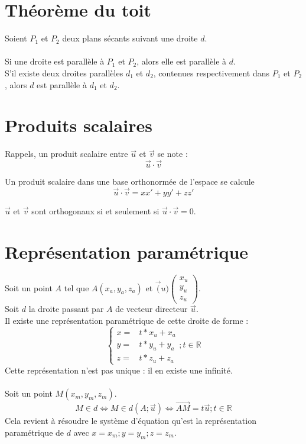 \documentclass{article}
\begin{document}
	\section{Théorème du toit}

	Soient $P_1$ et $P_2$ deux plans sécants suivant une droite $d$. \\
	\\
	Si une droite est parallèle à $P_1$ et $P_2$, alors elle est parallèle à $d$. \\
	S'il existe deux droites parallèles $d_1$ et $d_2$, contenues respectivement dans $P_1$ et $P_2$, alors $d$ est parallèle à $d_1$ et $d_2$.

	\section{Produits scalaires}

	Rappels, un produit scalaire entre $\vec{u}$ et $\vec{v}$ se note :
	\[ \vec{u} \cdot \vec{v} \]

	Un produit scalaire dans une base orthonormée de l'espace se calcule 
	\[ \vec{u} \cdot \vec{v} = xx'+yy'+zz' \]
	
	$\vec{u}$ et $\vec{v}$ sont orthogonaux si et seulement si $\vec{u} \cdot \vec{v} = 0$.

	\section{Représentation paramétrique}

	Soit un point $A$ tel que $A (x_a,y_a,z_a)$ et $\vec(u) \begin{pmatrix}x_u\\y_u\\z_u\end{pmatrix}$. \\
	Soit $d$ la droite passant par $A$ de vecteur directeur $\vec{u}$. \\
	Il existe une représentation paramétrique de cette droite de forme :
	\[ 
		\left\{ 
			\begin{array}{cc}
				x = & t*x_u + x_a \\
				y = & t*y_u + y_a \\
				z = & t*z_u + z_a
			\end{array}
		\right.
		; t \in \mathbb{R}
	\]
	Cette représentation n'est pas unique : il en existe une infinité. \\
	\\
	Soit un point $M(x_m,y_m,z_m)$. \\
	\[ M \in d \Leftrightarrow M \in d(A;\vec{u}) \Leftrightarrow \vec{AM}=t\vec{u};t\in\mathbb{R}\]
	Cela revient à résoudre le système d'équation qu'est la représentation paramétrique de $d$ avec $x=x_m;y=y_m;z=z_m$.
\end{document}
